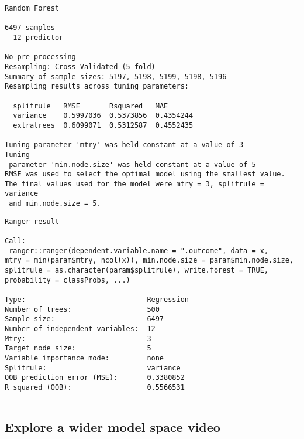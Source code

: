 \documentclass[
]{book}
\newenvironment{Shaded}{\begin{snugshade}}{\end{snugshade}}
\newcommand{\NormalTok}[1]{#1}
\newcommand{\OperatorTok}[1]{\textcolor[rgb]{0.81,0.36,0.00}{\textbf{#1}}}
\begin{document}
\begin{verbatim}
Random Forest 

6497 samples
  12 predictor

No pre-processing
Resampling: Cross-Validated (5 fold) 
Summary of sample sizes: 5197, 5198, 5199, 5198, 5196 
Resampling results across tuning parameters:

  splitrule   RMSE       Rsquared   MAE      
  variance    0.5997036  0.5373856  0.4354244
  extratrees  0.6099071  0.5312587  0.4552435

Tuning parameter 'mtry' was held constant at a value of 3
Tuning
 parameter 'min.node.size' was held constant at a value of 5
RMSE was used to select the optimal model using the smallest value.
The final values used for the model were mtry = 3, splitrule = variance
 and min.node.size = 5.
\end{verbatim}

\begin{Shaded}
\end{Shaded}

\begin{verbatim}
Ranger result

Call:
 ranger::ranger(dependent.variable.name = ".outcome", data = x,      mtry = min(param$mtry, ncol(x)), min.node.size = param$min.node.size,      splitrule = as.character(param$splitrule), write.forest = TRUE,      probability = classProbs, ...) 

Type:                             Regression 
Number of trees:                  500 
Sample size:                      6497 
Number of independent variables:  12 
Mtry:                             3 
Target node size:                 5 
Variable importance mode:         none 
Splitrule:                        variance 
OOB prediction error (MSE):       0.3380852 
R squared (OOB):                  0.5566531 
\end{verbatim}

\begin{center}\rule{0.5\linewidth}{0.5pt}\end{center}

\hypertarget{explore-a-wider-model-space-video}{%
\subsection*{Explore a wider model space video}\label{explore-a-wider-model-space-video}}
\end{document}
